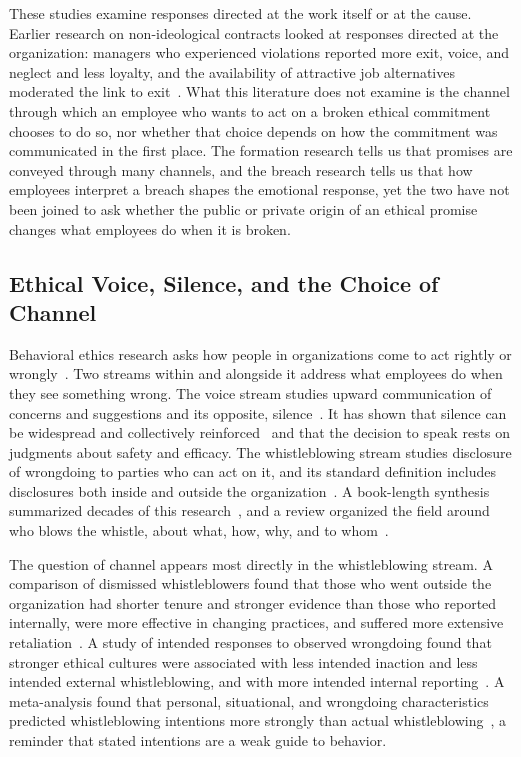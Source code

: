 These studies examine responses directed at the work itself or at the cause. Earlier research on non-ideological contracts looked at responses directed at the organization: managers who experienced violations reported more exit, voice, and neglect and less loyalty, and the availability of attractive job alternatives moderated the link to exit~\citep{turnley1999impact}. What this literature does not examine is the channel through which an employee who wants to act on a broken ethical commitment chooses to do so, nor whether that choice depends on how the commitment was communicated in the first place. The formation research tells us that promises are conveyed through many channels, and the breach research tells us that how employees interpret a breach shapes the emotional response, yet the two have not been joined to ask whether the public or private origin of an ethical promise changes what employees do when it is broken.

\subsection{Ethical Voice, Silence, and the Choice of Channel}

Behavioral ethics research asks how people in organizations come to act rightly or wrongly~\citep{trevino2006behavioral}. Two streams within and alongside it address what employees do when they see something wrong. The voice stream studies upward communication of concerns and suggestions and its opposite, silence~\citep{morrison2014employee,morrison2023employee}. It has shown that silence can be widespread and collectively reinforced~\citep{morrison2000organizational} and that the decision to speak rests on judgments about safety and efficacy. The whistleblowing stream studies disclosure of wrongdoing to parties who can act on it, and its standard definition includes disclosures both inside and outside the organization~\citep{near1985organizational}. A book-length synthesis summarized decades of this research~\citep{miceli2008whistleblowing}, and a review organized the field around who blows the whistle, about what, how, why, and to whom~\citep{culiberg2017evolution}.

The question of channel appears most directly in the whistleblowing stream. A comparison of dismissed whistleblowers found that those who went outside the organization had shorter tenure and stronger evidence than those who reported internally, were more effective in changing practices, and suffered more extensive retaliation~\citep{dworkin1998internal}. A study of intended responses to observed wrongdoing found that stronger ethical cultures were associated with less intended inaction and less intended external whistleblowing, and with more intended internal reporting~\citep{kaptein2011inaction}. A meta-analysis found that personal, situational, and wrongdoing characteristics predicted whistleblowing intentions more strongly than actual whistleblowing~\citep{mesmermagnus2005whistleblowing}, a reminder that stated intentions are a weak guide to behavior.

